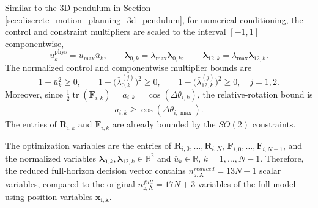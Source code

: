 Similar to the 3D pendulum in Section \ref{sec:discrete_motion_planning_3d_pendulum}, 
for numerical conditioning, the control and constraint multipliers are scaled
to the interval $[-1,1]$ componentwise,
\begin{equation}
u_k^{\mathrm{phys}}=u_{\max}\bar u_k,
\qquad
\bm{\lambda}_{0,k}=\lambda_{\max}\bar{\bm{\lambda}}_{0,k},
\qquad
\bm{\lambda}_{12,k}=\lambda_{\max}\bar{\bm{\lambda}}_{12,k}.
\label{eq:acrobot_variable_scaling}
\end{equation}
The normalized control and componentwise multiplier bounds are
\begin{equation}
1-\bar u_k^2\geq0,
\qquad
1-\bigl(\bar{\lambda}_{0,k}^{(j)}\bigr)^2\geq0,
\qquad
1-\bigl(\bar{\lambda}_{12,k}^{(j)}\bigr)^2\geq0,
\quad j=1,2.
\label{eq:acrobot_normalized_bounds}
\end{equation}
Moreover, since
$\tfrac12\operatorname{tr}(\bm{F}_{i,k})=a_{i,k}=\cos(\Delta\theta_{i,k})$,
the relative-rotation bound is
\begin{align}\label{eq:acrobot_normalized_f_bound}
a_{i,k}\geq\cos(\Delta\theta_{i,\max}).
\end{align} 
The entries of $\bm{R}_{i,k}$ and
$\bm{F}_{i,k}$ are already bounded by the $SO(2)$ constraints.

The optimization variables are the entries of
$\bm{R}_{i,0},\ldots,\bm{R}_{i,N}$, $\bm{F}_{i,0},\ldots,\bm{F}_{i,N-1}$, and the normalized
variables $\bar{\bm{\lambda}}_{0,k},\bar{\bm{\lambda}}_{12,k}\in\mathbb R^2$ and
$\bar u_k\in\mathbb R$, $k=1,\ldots,N-1$.
Therefore, the reduced full-horizon decision vector contains $n_{z,\mathrm{A}}^{reduced}=13N-1$
scalar variables, compared to the original $n_{z,\mathrm{A}}^{full}=17N+3$ variables of the full model using position variables $\bm{x_{i,k}}$.


